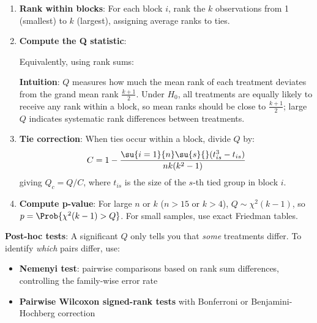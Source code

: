 \begin{enumerate}
    \item \textbf{Rank within blocks}: For each block $i$, rank the $k$ observations from
        1 (smallest) to $k$ (largest), assigning average ranks to ties.

    \item \textbf{Compute the Q statistic}:
        \begin{center}
        \end{center}

        Equivalently, using rank sums:
        \begin{center}
        \end{center}

        \textbf{Intuition}: $Q$ measures how much the mean rank of each treatment deviates
        from the grand mean rank $\frac{k+1}{2}$. Under $H_0$, all treatments are equally
        likely to receive any rank within a block, so mean ranks should be close to
        $\frac{k+1}{2}$; large $Q$ indicates systematic rank differences between treatments.

    \item \textbf{Tie correction}: When ties occur within a block, divide $Q$ by:
        $$C = 1 - \dfrac{\su{i=1}{n}\su{s}{}(t_{is}^3 - t_{is})}{nk(k^2-1)}$$
        giving $Q_c = Q / C$, where $t_{is}$ is the size of the $s$-th tied group in
        block $i$.

    \item \textbf{Compute p-value}: For large $n$ or $k$ ($n > 15$ or $k > 4$),
        $Q \sim \chi^2(k-1)$, so $p = \Prob{\chi^2(k-1) > Q}$. For small samples,
        use exact Friedman tables.
\end{enumerate}

\textbf{Post-hoc tests}: A significant $Q$ only tells you that \emph{some} treatments
differ. To identify \emph{which} pairs differ, use:
\begin{itemize}
    \item \textbf{Nemenyi test}: pairwise comparisons based on rank sum differences,
        controlling the family-wise error rate
    \item \textbf{Pairwise Wilcoxon signed-rank tests} with Bonferroni or
        Benjamini-Hochberg correction
\end{itemize}

